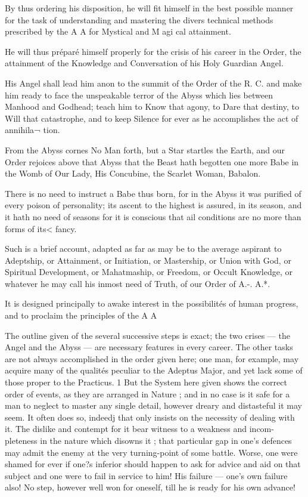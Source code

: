 By thus ordering his disposition, he will fit himself in the best possible manner for the task of understanding and mastering the divers technical methods prescribed by the A  A for Mystical and M agi cal attainment.

He will thus préparé himself properly for the crisis of his career in the Order, the attainment of the Knowledge and Conversation of his Holy Guardian Angel.

His Angel shall lead him anon to the summit of the Order of the R. C. and make him ready to face the unspeakable terror of the Abyss which lies between Manhood and Godhead; teach him to Know that agony, to Dare that destiny, to Will that catastrophe, and to keep Silence for ever as he accomplishes the act of annihila¬ tion.

From the Abyss cornes No Man forth, but a Star startles the Earth, and our Order rejoices above that Abyss that the Beast hath begotten one more Babe in the Womb of Our Lady, His Concubine, the Scarlet Woman, Babalon.

There is no need to instruct a Babe thus born, for in the Abyss it was purified of every poison of personality; its ascent to the highest is assured, in its season, and it hath no need of seasons for it is conscious that ail conditions are no more than forms of its< fancy.

Such is a brief account, adapted as far as may be to the average aspirant to Adeptship, or Attainment, or Initiation, or Mastership, or Union with God, or Spiritual Development, or Mahatmaship, or Freedom, or Occult Knowledge, or whatever he may call his inmost need of Truth, of our Order of A.-. A.*.

It is designed principally to awake interest in the possibilités of human progress, and to proclaim the principles of the A A

The outline given of the several successive steps is exact; the two crises — the Angel and the Abyss — are necessary features in every career. The other tasks are not always accomplished in the order given here; one man, for example, may acquire many of the qualités peculiar to the Adeptus Major, and yet lack some of those proper to the Practicus. 1 But the System here given shows the correct order of events, as they are arranged in Nature ; and in no case is it safe for a man to neglect to master any single detail, however dreary and distasteful it may seem. It often does so, indeedj that only insists on the necessity of dealing with it. The dislike and contempt for it bear witness to a weakness and incom- pleteness in the nature which disowns it ; that particular gap in one’s defences may admit the enemy at the very turning-point of some battle. Worse, one were shamed for ever if one?s inferior should happen to ask for advice and aid on that subject and one were to fail in service to him! His failure — one’s own failure also! No step, however well won for oneself, till he is ready for his own advance!


